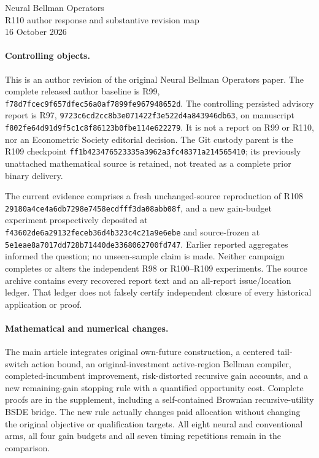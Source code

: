 \documentclass[11pt]{article}
\begin{document}
\begin{center}{\Large Neural Bellman Operators}\\[4pt]
{\large R110 author response and substantive revision map}\\16 October 2026\end{center}

\paragraph{Controlling objects.}
This is an author revision of the original Neural Bellman Operators paper. The complete released author baseline is R99, \nolinkurl{f78d7fcec9f657dfec56a0af7899fe967948652d}. The controlling persisted advisory report is R97, \nolinkurl{9723c6cd2cc8b3e071422f3e522d4a843946db63}, on manuscript \nolinkurl{f802fe64d91d9f5c1c8f86123b0fbe114e622279}. It is not a report on R99 or R110, nor an Econometric Society editorial decision. The Git custody parent is the R109 checkpoint \nolinkurl{ff1b423476523335a3962a3fc48371a214565410}; its previously unattached mathematical source is retained, not treated as a complete prior binary delivery.

The current evidence comprises a fresh unchanged-source reproduction of R108 \nolinkurl{29180a4ce4a6db7298e7458ecdfff3da08abb08f}, and a new gain-budget experiment prospectively deposited at \nolinkurl{f43602de6a29132feceb36d4b323c4c21a9e6ebe} and source-frozen at \nolinkurl{5e1eae8a7017dd728b71440de3368062700fd747}. Earlier reported aggregates informed the question; no unseen-sample claim is made. Neither campaign completes or alters the independent R98 or R100--R109 experiments. The source archive contains every recovered report text and an all-report issue/location ledger. That ledger does not falsely certify independent closure of every historical application or proof.

\paragraph{Mathematical and numerical changes.}
The main article integrates original own-future construction, a centered tail-switch action bound, an original-investment active-region Bellman compiler, completed-incumbent improvement, risk-distorted recursive gain accounts, and a new remaining-gain stopping rule with a quantified opportunity cost. Complete proofs are in the supplement, including a self-contained Brownian recursive-utility BSDE bridge. The new rule actually changes paid allocation without changing the original objective or qualification targets. All eight neural and conventional arms, all four gain budgets and all seven timing repetitions remain in the comparison.
\end{document}
